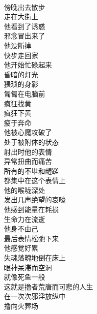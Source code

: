 \begin{poem}[那个忙碌的猥琐身影]
    \begin{multicols}{4}
        \centering~\\
        傍晚出去散步 \\ 走在大街上 \\ 他看到了诱惑 \\ 邪念冒出来了 \\ 他没断掉 \\ 快步走回家 \\ 他开始忙碌起来 \\ 昏暗的灯光 \\ 猥琐的身影 \\ 匍匐在电脑前 \\ 疯狂找黄 \\ 疯狂下黄 \\ 疲于奔命 \\ 他被心魔攻破了 \\ 处于被附体的状态 \\ 射出时他的表情 \\ 异常扭曲而痛苦 \\ 所有的不堪和龌蹉 \\ 都集中在这个表情上 \\ 他的喉咙深处 \\ 发出几声绝望的哀嚎 \\ 他感到能量在耗损 \\ 生命力在流逝 \\ 他身不由己 \\ 最后表情松弛下来 \\ 他感觉好累 \\ 失魂落魄地倒在床上 \\ 眼神呆滞而空洞 \\ 就像死鱼一般 \\ 这就是撸者荒唐而可悲的人生 \\ 在一次次邪淫放纵中 \\ 撸向火葬场
    \end{multicols}
\end{poem}

